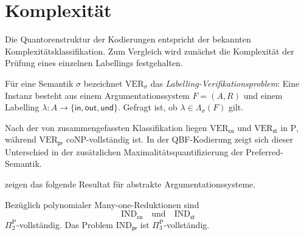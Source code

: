 \section{Komplexität}
\label{sec:independence-complexity}

Die Quantorenstruktur der Kodierungen entspricht der bekannten
Komplexitätsklassifikation. Zum Vergleich wird zunächst die Komplexität der
Prüfung eines einzelnen Labellings festgehalten.

\begin{Definition}
    \label{def:labelling-verification-problem}
    Für eine Semantik \(\sigma\) bezeichnet
    \(\mathrm{VER}_\sigma\) das \emph{Labelling-Verifikationsproblem}:
    Eine Instanz besteht aus einem Argumentationssystem \(F=(A,R)\) und
    einem Labelling \(\lambda\colon A\to
    \{\mathsf{in},\mathsf{out},\mathsf{und}\}\). Gefragt ist, ob
    \(\lambda\in\Lambda_\sigma(F)\) gilt.
\end{Definition}

Nach der von \textcite[Tabelle~3.1]{dvorak:2012:computational-aspects}
zusammengefassten Klassifikation liegen
\(\mathrm{VER}_{\mathsf{co}}\) und
\(\mathrm{VER}_{\mathsf{st}}\) in \(\mathrm P\), während
\(\mathrm{VER}_{\mathsf{pr}}\) \(\mathrm{coNP}\)-vollständig ist. In
der QBF-Kodierung zeigt sich dieser Unterschied in der zusätzlichen
Maximalitätsquantifizierung der Preferred-Semantik.

\textcite[Proposition~C.4]{bluemel:2025:independence-aba} zeigen das
folgende Resultat für abstrakte Argumentationssysteme.

\begin{Theorem}
    \label{thm:independence-complexity}
    Bezüglich polynomialer Many-one-Reduktionen sind
    \[
        \mathrm{IND}_{\mathsf{co}}
        \quad\text{und}\quad
        \mathrm{IND}_{\mathsf{st}}
    \]
    \(\Pi^{\mathrm P}_2\)-vollständig. Das Problem
    \(\mathrm{IND}_{\mathsf{pr}}\) ist
    \(\Pi^{\mathrm P}_3\)-vollständig.
\end{Theorem}

